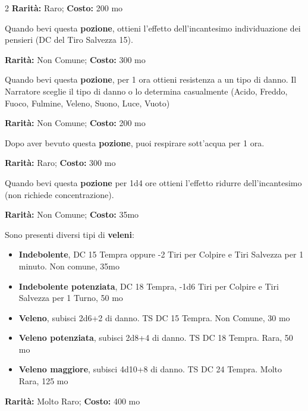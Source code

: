 \begin{multicols}{2}
\textbf{Rarità:} Raro; \textbf{Costo:} 200 mo

Quando bevi questa \textbf{pozione}, ottieni l'effetto dell'incantesimo individuazione dei pensieri (DC del Tiro Salvezza 15).


\textbf{Rarità:} Non Comune; \textbf{Costo:} 300 mo

Quando bevi questa \textbf{pozione}, per 1 ora ottieni resistenza a un tipo di danno. Il Narratore sceglie il tipo di danno o lo determina casualmente (Acido, Freddo, Fuoco, Fulmine, Veleno, Suono, Luce, Vuoto)


\textbf{Rarità:} Non Comune; \textbf{Costo:} 200 mo

Dopo aver bevuto questa \textbf{pozione}, puoi respirare sott'acqua per 1 ora.


\textbf{Rarità:} Raro; \textbf{Costo:} 300 mo

Quando bevi questa \textbf{pozione} per 1d4 ore ottieni l'effetto ridurre dell'incantesimo (non richiede concentrazione).


\textbf{Rarità:} Non Comune; \textbf{Costo:} 35mo

Sono presenti diversi tipi di \textbf{veleni}:

\begin{itemize} \setlength\itemsep{0em}
\item \textbf{Indebolente}, DC 15 Tempra oppure -2 Tiri per Colpire e Tiri Salvezza per 1 minuto. Non comune, 35mo
\item \textbf{Indebolente potenziata}, DC 18 Tempra, -1d6 Tiri per Colpire e Tiri Salvezza per 1 Turno, 50 mo
\item \textbf{Veleno}, subisci 2d6+2 di danno. TS DC 15 Tempra. Non Comune, 30 mo
\item \textbf{Veleno potenziata}, subisci 2d8+4 di danno. TS DC 18 Tempra. Rara, 50 mo
\item \textbf{Veleno maggiore}, subisci 4d10+8 di danno. TS DC 24 Tempra. Molto Rara, 125 mo
\end{itemize}


\textbf{Rarità:} Molto Raro; \textbf{Costo:} 400 mo


\end{multicols}
